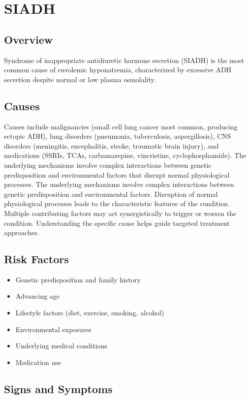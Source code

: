 \chapter{SIADH}
\label{sec:SIADH}

\section{Overview}
Syndrome of inappropriate antidiuretic hormone secretion (SIADH) is the most common cause of euvolemic hyponatremia, characterized by excessive ADH secretion despite normal or low plasma osmolality.
\section{Causes}
Causes include malignancies (small cell lung cancer most common, producing ectopic ADH), lung disorders (pneumonia, tuberculosis, aspergillosis), CNS disorders (meningitis, encephalitis, stroke, traumatic brain injury), and medications (SSRIs, TCAs, carbamazepine, vincristine, cyclophosphamide). The underlying mechanisms involve complex interactions between genetic predisposition and environmental factors that disrupt normal physiological processes. The underlying mechanisms involve complex interactions between genetic predisposition and environmental factors. Disruption of normal physiological processes leads to the characteristic features of the condition. Multiple contributing factors may act synergistically to trigger or worsen the condition. Understanding the specific cause helps guide targeted treatment approaches.
\section{Risk Factors}


\begin{itemize}[noitemsep]
  \item Genetic predisposition and family history
  \item Advancing age
  \item Lifestyle factors (diet, exercise, smoking, alcohol)
  \item Environmental exposures
  \item Underlying medical conditions
  \item Medication use
\end{itemize}
\section{Signs and Symptoms}

